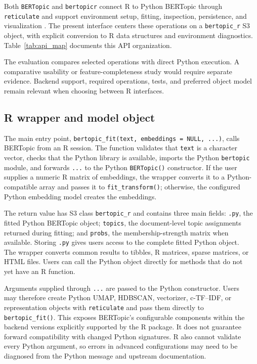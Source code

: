 \documentclass[12pt]{article}
\newcommand{\pkg}[1]{\texttt{#1}}
\newcommand{\code}[1]{\texttt{#1}}
\newcommand{\fcode}[1]{\nolinkurl{#1}}
\begin{document}
Both \pkg{BERTopic} and \pkg{bertopicr} connect R to Python BERTopic through \pkg{reticulate} and support environment setup, fitting, inspection, persistence, and visualization \citep{petric2026bertopicr}. The present interface centers these operations on a \fcode{bertopic_r} S3 object, with explicit conversion to R data structures and environment diagnostics. Table~\ref{tab:api_map} documents this API organization.

The evaluation compares selected operations with direct Python execution. A comparative usability or feature-completeness study would require separate evidence. Backend support, required operations, tests, and preferred object model remain relevant when choosing between R interfaces.

\subsection{R wrapper and model object}

The main entry point, \code{bertopic\_fit(text, embeddings = NULL, ...)}, calls BERTopic from an R session. The function validates that \code{text} is a character vector, checks that the Python library is available, imports the Python \code{bertopic} module, and forwards \code{...} to the Python \code{BERTopic()} constructor. If the user supplies a numeric R matrix of embeddings, the wrapper converts it to a Python-compatible array and passes it to \code{fit\_transform()}; otherwise, the configured Python embedding model creates the embeddings.

The return value has S3 class \code{bertopic\_r} and contains three main fields: \code{.py}, the fitted Python BERTopic object; \code{topics}, the document-level topic assignments returned during fitting; and \code{probs}, the membership-strength matrix when available. Storing \code{.py} gives users access to the complete fitted Python object. The wrapper converts common results to tibbles, R matrices, sparse matrices, or HTML files. Users can call the Python object directly for methods that do not yet have an R function.

Arguments supplied through \code{...} are passed to the Python constructor. Users may therefore create Python UMAP, HDBSCAN, vectorizer, c-TF--IDF, or representation objects with \pkg{reticulate} and pass them directly to \code{bertopic\_fit()}. This exposes BERTopic's configurable components within the backend versions explicitly supported by the R package. It does not guarantee forward compatibility with changed Python signatures. R also cannot validate every Python argument, so errors in advanced configurations may need to be diagnosed from the Python message and upstream documentation.
\end{document}
